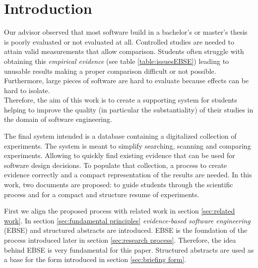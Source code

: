

\section{Introduction}
\label{sec:introduction}

Our advisor observed that most software build in a bachelor's or master's thesis is poorly evaluated or not evaluated at all. Controlled studies are needed to attain valid measurements that allow comparison. Students often struggle with obtaining this \emph{empirical evidence} (see table \ref{table:issuesEBSE}) leading to unusable results making a proper comparison difficult or not possible. Furthermore, large pieces of software are hard to evaluate because effects can be hard to isolate.\\
Therefore, the aim of this work is to create a supporting system for students helping to improve the quality (in particular the substantiality) of their studies in the domain of software engineering.

The final system intended is a database containing a digitalized collection of experiments. The system is meant to simplify searching, scanning and comparing experiments. Allowing to quickly find existing evidence that can be used for software design decisions. To populate that collection, a process to create evidence correctly and a compact representation of the results are needed. In this work, two documents are proposed: \emph{\checklist} to guide students through the scientific process and \emph{\briefingform} for a compact and structure resume of experiments.

First we align the proposed process with related work in section \ref{sec:related work}. In section \ref{sec:fundamental principles} \emph{evidence-based software engineering} (EBSE) and structured abstracts are introduced. EBSE is the foundation of the process introduced later in section \ref{sec:research process}. Therefore, the idea behind EBSE is very fundamental  for this paper.
Structured abstracts are used as a base for the form introduced in section \ref{sec:briefing form}.













